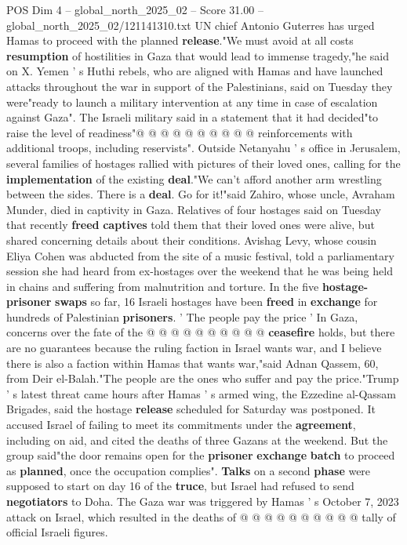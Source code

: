 \begin{textsample}{POS Dim 4 – global\_north\_2025\_02 – Score 31.00 – global\_north\_2025\_02/121141310.txt}
UN chief Antonio Guterres has urged Hamas to proceed with the planned \textbf{release}."We must avoid at all costs \textbf{resumption} of hostilities in Gaza that would lead to immense tragedy,"he said on X.
Yemen ' s Huthi rebels, who are aligned with Hamas and have launched attacks throughout the war in support of the Palestinians, said on Tuesday they were"ready to launch a military intervention at any time in case of escalation against Gaza".
The Israeli military said in a statement that it had decided"to raise the level of readiness"@ @ @ @ @ @ @ @ @ @ reinforcements with additional troops, including reservists".
Outside Netanyahu ' s office in Jerusalem, several families of hostages rallied with pictures of their loved ones, calling for the \textbf{implementation} of the existing \textbf{deal}."We can't afford another arm wrestling between the sides.
There is a \textbf{deal}.
Go for it!"said Zahiro, whose uncle, Avraham Munder, died in captivity in Gaza.
Relatives of four hostages said on Tuesday that recently \textbf{freed} \textbf{captives} told them that their loved ones were alive, but shared concerning details about their conditions.
Avishag Levy, whose cousin Eliya Cohen was abducted from the site of a music festival, told a parliamentary session she had heard from ex-hostages over the weekend that he was being held in chains and suffering from malnutrition and torture.
In the five \textbf{hostage-prisoner} \textbf{swaps} so far, 16 Israeli hostages have been \textbf{freed} in \textbf{exchange} for hundreds of Palestinian \textbf{prisoners}. ' The people pay the price ' In Gaza, concerns over the fate of the @ @ @ @ @ @ @ @ @ @ \textbf{ceasefire} holds, but there are no guarantees because the ruling faction in Israel wants war, and I believe there is also a faction within Hamas that wants war,"said Adnan Qassem, 60, from Deir el-Balah."The people are the ones who suffer and pay the price."Trump ' s latest threat came hours after Hamas ' s armed wing, the Ezzedine al-Qassam Brigades, said the hostage \textbf{release} scheduled for Saturday was postponed.
It accused Israel of failing to meet its commitments under the \textbf{agreement}, including on aid, and cited the deaths of three Gazans at the weekend.
But the group said"the door remains open for the \textbf{prisoner} \textbf{exchange} \textbf{batch} to proceed as \textbf{planned}, once the occupation complies". \textbf{Talks} on a second \textbf{phase} were supposed to start on day 16 of the \textbf{truce}, but Israel had refused to send \textbf{negotiators} to Doha.
The Gaza war was triggered by Hamas ' s October 7, 2023 attack on Israel, which resulted in the deaths of @ @ @ @ @ @ @ @ @ @ tally of official Israeli figures.

\end{textsample}
